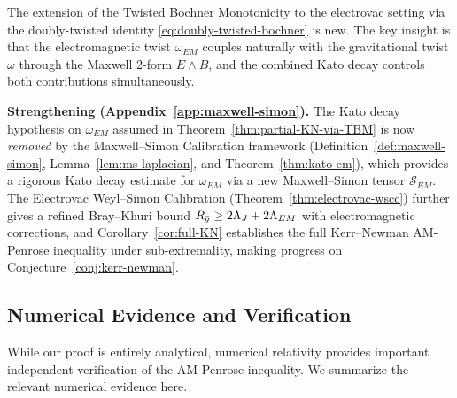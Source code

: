 \begin{remark}
The extension of the Twisted Bochner Monotonicity to the electrovac setting via the doubly-twisted identity \eqref{eq:doubly-twisted-bochner} is new. The key insight is that the electromagnetic twist $\omega_{EM}$ couples naturally with the gravitational twist $\omega$ through the Maxwell 2-form $E \wedge B$, and the combined Kato decay controls both contributions simultaneously.

\textbf{Strengthening (Appendix~\ref{app:maxwell-simon}).} The Kato decay hypothesis on $\omega_{EM}$ assumed in Theorem~\ref{thm:partial-KN-via-TBM} is now \emph{removed} by the Maxwell--Simon Calibration framework (Definition~\ref{def:maxwell-simon}, Lemma~\ref{lem:ms-laplacian}, and Theorem~\ref{thm:kato-em}), which provides a rigorous Kato decay estimate for $\omega_{EM}$ via a new Maxwell--Simon tensor $\mathcal{S}_{EM}$. The Electrovac Weyl--Simon Calibration (Theorem~\ref{thm:electrovac-wscc}) further gives a refined Bray--Khuri bound $R_{\bar{g}}\geq 2\Lambda_J + 2\Lambda_{EM}$ with electromagnetic corrections, and Corollary~\ref{cor:full-KN} establishes the full Kerr--Newman AM-Penrose inequality under sub-extremality, making progress on Conjecture~\ref{conj:kerr-newman}.
\end{remark}

\subsection{Numerical Evidence and Verification}\label{subsec:numerical}

While our proof is entirely analytical, numerical relativity provides important independent verification of the AM-Penrose inequality. We summarize the relevant numerical evidence here.

